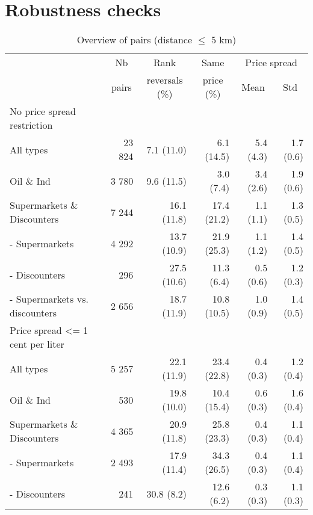 \documentclass[english]{article}
\begin{document}
\newpage

\section{Robustness checks}

\begin{table}[H]
\begin{threeparttable}
\renewcommand{\arraystretch}{0.8} %
\caption{Overview of pairs (distance $\le$ 5 km)}
\label{tab:stats_pair_rank_reversals}
    \begin{tabular}{lrrrrr}
    \toprule
    \toprule
          & \multicolumn{1}{c}{Nb} & \multicolumn{1}{c}{Rank} & \multicolumn{1}{c}{Same} & \multicolumn{2}{c}{Price spread} \\
          & \multicolumn{1}{c}{pairs} & \multicolumn{1}{c}{reversals (\%)} & \multicolumn{1}{c}{price (\%)} & \multicolumn{1}{c}{Mean} & \multicolumn{1}{c}{Std} \\
    \midrule
    No price spread restriction &       &       &       &       &  \\
    All types & 23 824 & 7.1 (11.0) & 6.1 (14.5) & 5.4 (4.3) & 1.7 (0.6) \\
    Oil \& Ind & 3 780 & 9.6 (11.5) & 3.0 (7.4) & 3.4 (2.6) & 1.9 (0.6) \\
    Supermarkets \& Discounters & 7 244 & 16.1 (11.8) & 17.4 (21.2) & 1.1 (1.1) & 1.3 (0.5) \\
    - Supermarkets & 4 292 & 13.7 (10.9) & 21.9 (25.3) & 1.1 (1.2) & 1.4 (0.5) \\
    - Discounters & 296   & 27.5 (10.6) & 11.3 (6.4) & 0.5 (0.6) & 1.2 (0.3) \\
    - Supermarkets vs. discounters & 2 656 & 18.7 (11.9) & 10.8 (10.5) & 1.0 (0.9) & 1.4 (0.5) \\
    \midrule
    Price spread <= 1 cent per liter &       &       &       &       &  \\
    All types & 5 257 & 22.1 (11.9) & 23.4 (22.8) & 0.4 (0.3) & 1.2 (0.4) \\
    Oil \& Ind & 530   & 19.8 (10.0) & 10.4 (15.4) & 0.6 (0.3) & 1.6 (0.4) \\
    Supermarkets \& Discounters & 4 365 & 20.9 (11.8) & 25.8 (23.3) & 0.4 (0.3) & 1.1 (0.4) \\
    - Supermarkets & 2 493 & 17.9 (11.4) & 34.3 (26.5) & 0.4 (0.3) & 1.1 (0.4) \\
    - Discounters & 241   & 30.8 (8.2) & 12.6 (6.2) & 0.3 (0.3) & 1.1 (0.3) \\

\end{tabular}
\end{threeparttable}
\end{table}
\end{document}
